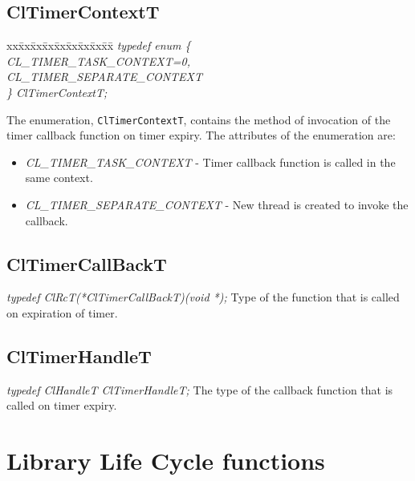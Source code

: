 \begin{flushleft}
\subsection{ClTimerContextT }
\begin{tabbing}
xx\=xx\=xx\=xx\=xx\=xx\=xx\=xx\=xx\=\kill
\textit{typedef enum \{}\\
\>\>\>\>\textit{CL\_TIMER\_TASK\_CONTEXT=0,}\\
\>\>\>\>\textit{CL\_TIMER\_SEPARATE\_CONTEXT}\\
\textit{\} ClTimerContextT;}\end{tabbing}
The enumeration, {\tt{ClTimerContextT}}, contains the method of invocation of the timer callback function on timer expiry.
The attributes of the enumeration are:
\begin{itemize}
\item
\textit{CL\_\-TIMER\_\-TASK\_\-CONTEXT} - Timer callback function is called in the same context.
\item
\textit{CL\_\-TIMER\_\-SEPARATE\_\-CONTEXT} - New thread is created to invoke the callback.
\end{itemize}




\subsection{ClTimerCallBackT }
\textit{typedef ClRcT(*ClTimerCallBackT)(void *);}
\newline
\newline
Type of the function that is called on expiration of timer.

\subsection{ClTimerHandleT}
\textit{typedef ClHandleT ClTimerHandleT;}
\newline
\newline
The type of the callback function that is called on timer expiry.



\newpage


\section{Library Life Cycle functions}

\end{flushleft}
